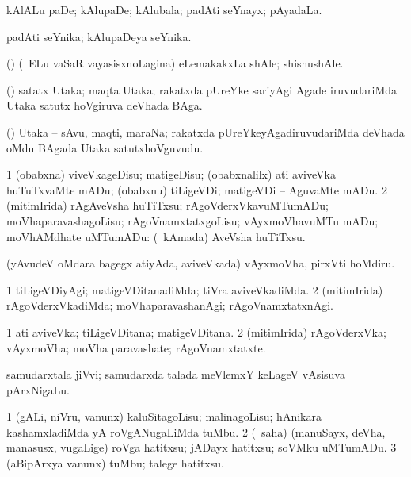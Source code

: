 \bentry
{}
\gl{\nA}
\bmng
kAlALu paDe; kAlupaDe; kAlubala; padAti seYnayx; pAyadaLa. 
\emng
\eentry

\bentry
{}
\gl{\nA}
\bmng
padAti seYnika; kAlupaDeya seYnika. 
\emng
\eentry

\bentry
{}
\gl{\nA}
\bmng
(\birx) (\sA\ ELu vaSaR vayasisxnoLagina) eLemakakxLa shAle; shishushAle. 
\emng
\eentry

\bentry
{}
\gl{\nA}
\bmng
(\roVshA) satatx Utaka; maqta Utaka; rakatxda pUreYke sariyAgi Agade iruvudariMda Utaka satutx hoVgiruva deVhada BAga. 
\emng
\eentry

\bentry
{}
\gl{\nA}
\bmng
(\roVshA) Utaka -- sAvu, maqti, maraNa; rakatxda pUreYkeyAgadiruvudariMda deVhada oMdu BAgada Utaka satutxhoVguvudu. 
\emng
\eentry

\bentry
{}
\gl{\sakirx}
\bmng
\bnum
\num{1} (obabxna) viveVkageDisu; matigeDisu; (obabxnalilx) ati aviveVka huTuTxvaMte mADu; (obabxnu) tiLigeVDi; matigeVDi -- AguvaMte mADu. 
\num{2} (mitimIrida) rAgAveVsha huTiTxsu; rAgoVderxVkavuMTumADu; moVhaparavashagoLisu; rAgoVnamxtatxgoLisu; vAyxmoVhavuMTu mADu; moVhAMdhate uMTumADu: (\kanmu\ kAmada) AveVsha huTiTxsu. 
\enum
\emng

\noindent
\gl{\pagu}
\bmng
{} (yAvudeV oMdara bagegx atiyAda, aviveVkada) vAyxmoVha, pirxVti hoMdiru. 
\emng
\eentry

\bentry
{}
\gl{\kirxvi}
\bmng
\bnum
\num{1} tiLigeVDiyAgi; matigeVDitanadiMda; tiVra aviveVkadiMda. 
\num{2} (mitimIrida) rAgoVderxVkadiMda; moVhaparavashanAgi; rAgoVnamxtatxnAgi. 
\enum
\emng
\eentry

\bentry
{}
\gl{\nA}
\bmng
\bnum
\num{1} ati aviveVka; tiLigeVDitana; matigeVDitana. 
\num{2} (mitimIrida) rAgoVderxVka; vAyxmoVha; moVha paravashate; rAgoVnamxtatxte. 
\enum
\emng
\eentry

\bentry
{}
\gl{\nA}
\bmng
samudarxtala jiVvi; samudarxda talada meVlemxY keLageV vAsisuva pArxNigaLu. 
\emng
\eentry

\bentry
{}
\gl{\sakirx}
\bmng
\bnum
\num{1} (gALi, niVru, \mo vanunx) kaluSitagoLisu; malinagoLisu; hAnikara kashamxladiMda yA roVgANugaLiMda tuMbu. 
\num{2} (\rUpa\ saha) (manuSayx, deVha, manasusx, \mo vugaLige) roVga hatitxsu; jADayx hatitxsu; soVMku uMTumADu. 
\num{3} (aBipArxya \mo vanunx) tuMbu; talege hatitxsu. 
\enum
\emng
\eentry

